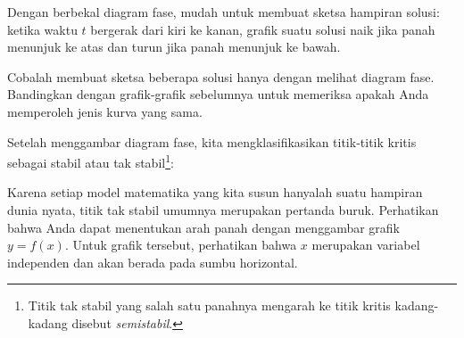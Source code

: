 \begin{center}
\end{center}

\pagebreak[0]
Dengan berbekal diagram fase,
mudah untuk membuat sketsa hampiran solusi: ketika waktu $t$
bergerak dari kiri ke kanan,
grafik suatu solusi
naik jika panah menunjuk ke atas dan turun jika panah menunjuk ke bawah.

\begin{exercise}
Cobalah membuat sketsa beberapa solusi hanya dengan melihat diagram fase.
Bandingkan dengan grafik-grafik sebelumnya untuk memeriksa apakah
Anda memperoleh jenis kurva yang sama.
\end{exercise}

\pagebreak[0]
Setelah menggambar diagram fase, kita mengklasifikasikan titik-titik kritis
sebagai stabil atau tak stabil\footnote{Titik tak stabil
yang salah satu
panahnya mengarah ke titik kritis kadang-kadang disebut
\emph{semistabil}.}:
\begin{center}
\end{center}
Karena setiap model matematika yang kita susun hanyalah suatu hampiran
dunia nyata, titik tak stabil umumnya merupakan pertanda buruk.
Perhatikan bahwa Anda dapat menentukan arah panah dengan menggambar grafik $y=f(x)$.
Untuk grafik tersebut, perhatikan bahwa $x$ merupakan variabel independen dan akan
berada pada sumbu horizontal.

\medskip

